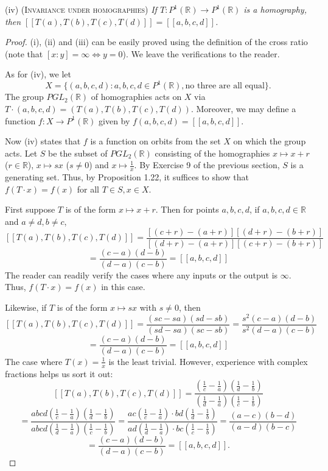 \documentclass[leqno]{book}
\begin{document}
(iv) \textsc{(Invariance under homographies)} \emph{If $T:P^1(\mathbb R)\to P^1(\mathbb R)$ is a homography, then $[\![T(a),T(b),T(c),T(d)]\!]=[\![a,b,c,d]\!]$.}
\begin{proof}
(i), (ii) and (iii) can be easily proved using the definition of the cross ratio (note that $[x:y]=\infty\iff y=0$).  We leave the verifications to the reader.

As for (iv), we let
$$X=\{(a,b,c,d):a,b,c,d\in P^1(\mathbb R),\text{no three are all equal}\}.$$
The group $PGL_2(\mathbb R)$ of homographies acts on $X$ via $T\cdot(a,b,c,d)=(T(a),T(b),T(c),T(d))$.  Moreover, we may define a function $f:X\to P^1(\mathbb R)$ given by $f(a,b,c,d)=[\![a,b,c,d]\!]$.

Now (iv) states that $f$ is a function on orbits from the set $X$ on which the group acts.  Let $S$ be the subset of $PGL_2(\mathbb R)$ consisting of the homographies $x\mapsto x+r$ ($r\in\mathbb R$), $x\mapsto sx$ ($s\ne 0$) and $x\mapsto\frac 1x$.  By Exercise 9 of the previous section, $S$ is a generating set.  Thus, by Proposition 1.22, it suffices to show that $f(T\cdot x)=f(x)$ for all $T\in S,x\in X$.

First suppose $T$ is of the form $x\mapsto x+r$.  Then for points $a,b,c,d$, if $a,b,c,d\in\mathbb R$ and $a\ne d,b\ne c$,
$$[\![T(a),T(b),T(c),T(d)]\!]=\frac{[(c+r)-(a+r)][(d+r)-(b+r)]}{[(d+r)-(a+r)][(c+r)-(b+r)]}$$
$$=\frac{(c-a)(d-b)}{(d-a)(c-b)}=[\![a,b,c,d]\!]$$
The reader can readily verify the cases where any inputs or the output is $\infty$.  Thus, $f(T\cdot x)=f(x)$ in this case.

Likewise, if $T$ is of the form $x\mapsto sx$ with $s\ne 0$, then
$$[\![T(a),T(b),T(c),T(d)]\!]=\frac{(sc-sa)(sd-sb)}{(sd-sa)(sc-sb)}=\frac{s^2(c-a)(d-b)}{s^2(d-a)(c-b)}$$
$$=\frac{(c-a)(d-b)}{(d-a)(c-b)}=[\![a,b,c,d]\!]$$
The case where $T(x)=\frac 1x$ is the least trivial.  However, experience with complex fractions helps us sort it out:
$$[\![T(a),T(b),T(c),T(d)]\!]=\frac{\left(\frac 1c-\frac 1a\right)\left(\frac 1d-\frac 1b\right)}{\left(\frac 1d-\frac 1a\right)\left(\frac 1c-\frac 1b\right)}$$
$$=\frac{abcd\left(\frac 1c-\frac 1a\right)\left(\frac 1d-\frac 1b\right)}{abcd\left(\frac 1d-\frac 1a\right)\left(\frac 1c-\frac 1b\right)}=\frac{ac\left(\frac 1c-\frac 1a\right)\cdot bd\left(\frac 1d-\frac 1b\right)}{ad\left(\frac 1d-\frac 1a\right)\cdot bc\left(\frac 1c-\frac 1b\right)}=\frac{(a-c)(b-d)}{(a-d)(b-c)}$$
$$=\frac{(c-a)(d-b)}{(d-a)(c-b)}=[\![a,b,c,d]\!].$$
\end{proof}
\end{document}
